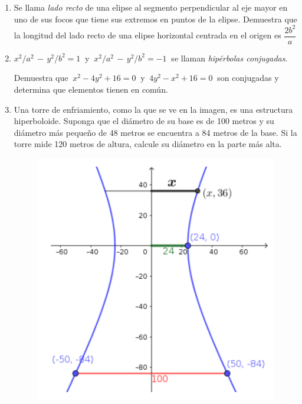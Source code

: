 \begin{enumerate}
\vspace{5mm}
\item	Se llama \emph{lado recto} de una elipse al segmento perpendicular al eje mayor en uno de sus focos que tiene sus extremos en puntos de la elipse. Demuestra que la longitud del lado recto de una elipse horizontal centrada en el origen es $\dfrac{2b^2}{a}$

\vspace{-4mm}
\begin{flushright}
\begin{footnotesize} \textcolor{gris}{}	\end{footnotesize}
\end{flushright}

\vspace{5mm}
\item	$x^2/a^2 \, - \, y^2/b^2 = 1 \  $  y $\ x^2/a^2 \, - \, y^2/b^2 = -1 \ $ se llaman \emph{hipérbolas conjugadas}.

Demuestra que $\ x^2-4y^2+16=0\ $ y $\ 4y^2-x^2+16=0\ $ son conjugadas y determina que elementos tienen en común.

\vspace{-4mm}
\begin{flushright}
\begin{footnotesize} \textcolor{gris}{}	\end{footnotesize}
\end{flushright}



\vspace{5mm}
\item	
\begin{multicols}{2} Una torre de enfriamiento, como la que se ve en la imagen, es una estructura hiperboloide. Suponga que el diámetro de su base es de 100 metros y su diámetro más pequeño de 48 metros se encuentra a 84 metros de la base. Si la torre mide 120 metros de altura, calcule su diámetro en la parte más alta.

\begin{figure}[H]
	\centering
	\includegraphics[width=.3\textwidth]{img-conicas/conicas45.png}
	\end{figure} \end{multicols}


\end{enumerate}
